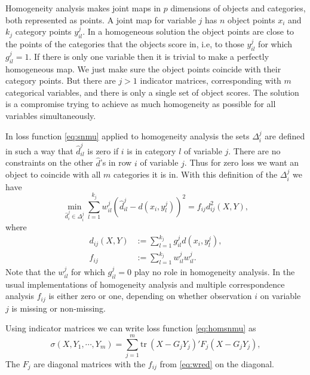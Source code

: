 \documentclass[
  12pt,
]{article}
\begin{document}
Homogeneity analysis makes joint maps in \(p\) dimensions of objects
and categories, both represented as points. A joint map for variable \(j\)
has \(n\) object points \(x_i\) and \(k_j\) category points \(y^j_{il}\).
In a homogeneous solution the object points are close to the points of the categories that the objects score in, i.e, to those \(y^j_{il}\) for which \(g^j_{il}=1\). If there is only one variable then it is trivial to make a perfectly homogeneous map. We just make sure the object points coincide with their category points. But there are \(j>1\) indicator matrices, corresponding with \(m\) categorical variables, and there is only a single set of object scores. The solution is a compromise trying to achieve as much homogeneity as possible for all variables simultaneously.

In loss function \eqref{eq:snmu} applied to homogeneity analysis
the sets \(\Delta_i^j\) are defined in such a way that \(\hat d_{il}^j\) is zero if \(i\) is in category \(l\) of
variable \(j\). There are no constraints on the other \(\hat d\)'s in row \(i\)
of variable \(j\). Thus for zero loss we want an object to coincide with all \(m\) categories it is in. With this definition of the \(\Delta_i^j\) we have
\begin{equation}
\min_{\hat d_i^j\in\Delta_i^j}\sum_{l=1}^{k_j}w_{il}^j(\hat d_{il}^j-d(x_i,y_l^j))^2=f_{ij}d_{ij}^2(X,Y),
\label{eq:homsnmu}
\end{equation}
where
\begin{subequations}
\begin{align}
d_{ij}(X,Y)&:=\sum_{l=1}^{k_j}g_{il}^jd(x_i,y^j_l),\label{eq:dred}\\
f_{ij}&:=\sum_{l=1}^{k_j}w^j_{il}w^j_{il}.\label{eq:wred}
\end{align}
\end{subequations}
Note that the \(w^j_{il}\) for which \(g^j_{il}=0\) play no role in
homogeneity analysis. In the usual implementations of homogeneity
analysis and multiple correspondence analysis
\(f_{ij}\) is either zero or one, depending on whether observation
\(i\) on variable \(j\) is missing or non-missing.

Using indicator matrices we can write loss function \eqref{eq:homsnmu} as
\begin{equation}
\sigma(X,Y_1,\cdots,Y_m)=
\sum_{j=1}^m\text{tr}\ (X-G_jY_j)'F_j(X-G_jY_j),
\label{eq:matsnmu}
\end{equation}
The \(F_j\) are diagonal matrices with the \(f_{ij}\) from \eqref{eq:wred}
on the diagonal.
\end{document}
